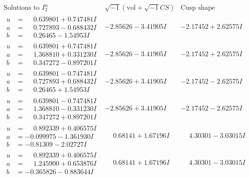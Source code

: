 \documentclass[1p]{elsarticle_modified}
\theoremstyle{definition}
\newcommand{\I}{\sqrt{-1}}
\begin{document}
$$\begin{array}{c|c|c}  
\text{Solutions to }I^u_{2}& \I (\text{vol} + \sqrt{-1}CS) & \text{Cusp shape}\\
 \hline 
\begin{aligned}
u &= \phantom{-}0.639801 + 0.747481 I \\
a &= \phantom{-}0.727893 - 0.688432 I \\
b &= \phantom{-}0.26465 - 1.54953 I\end{aligned}
 & -2.85626 - 3.41905 I & -2.17452 + 2.62575 I \\ \hline\begin{aligned}
u &= \phantom{-}0.639801 + 0.747481 I \\
a &= \phantom{-}1.368810 + 0.331230 I \\
b &= \phantom{-}0.347272 - 0.897201 I\end{aligned}
 & -2.85626 - 3.41905 I & -2.17452 + 2.62575 I \\ \hline\begin{aligned}
u &= \phantom{-}0.639801 - 0.747481 I \\
a &= \phantom{-}0.727893 + 0.688432 I \\
b &= \phantom{-}0.26465 + 1.54953 I\end{aligned}
 & -2.85626 + 3.41905 I & -2.17452 - 2.62575 I \\ \hline\begin{aligned}
u &= \phantom{-}0.639801 - 0.747481 I \\
a &= \phantom{-}1.368810 - 0.331230 I \\
b &= \phantom{-}0.347272 + 0.897201 I\end{aligned}
 & -2.85626 + 3.41905 I & -2.17452 - 2.62575 I \\ \hline\begin{aligned}
u &= \phantom{-}0.892339 + 0.406575 I \\
a &= -0.099975 - 1.361930 I \\
b &= -0.81309 - 2.02727 I\end{aligned}
 & \phantom{-}0.68141 + 1.67196 I & \phantom{-}4.30301 - 3.03015 I \\ \hline\begin{aligned}
u &= \phantom{-}0.892339 + 0.406575 I \\
a &= \phantom{-}1.245900 + 0.653876 I \\
b &= -0.365826 - 0.883644 I\end{aligned}
 & \phantom{-}0.68141 + 1.67196 I & \phantom{-}4.30301 - 3.03015 I \\ \hline\begin{aligned}

\end{aligned}
\end{array}$$
\end{document}
